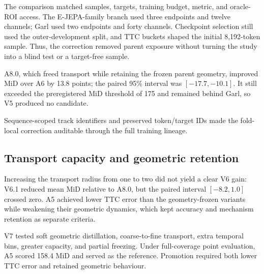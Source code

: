 The comparison matched samples, targets, training budget, metric, and oracle-ROI access. The E-JEPA-family branch used three endpoints and twelve channels; Garl used two endpoints and forty channels. Checkpoint selection still used the outer-development split, and TTC buckets shaped the initial 8,192-token sample. Thus, the correction removed parent exposure without turning the study into a blind test or a target-free sample. 

\begin{table}[htbp]
\centering\small

\caption{Scientific Recovery V5--V6 results on 8,192 tokens from nine sequences, three folds, and seed 7.}
\label{tab:early-v5v6}
\end{table}

A8.0, which freed transport while retaining the frozen parent geometry, improved MiD over A6 by 13.8 points; the paired 95\% interval was $[-17.7,-10.1]$. It still exceeded the preregistered MiD threshold of 175 and remained behind Garl, so V5 produced no candidate.

Sequence-scoped track identifiers and preserved token/target IDs made the fold-local correction auditable through the full training lineage. 

\subsection{Transport capacity and geometric retention}

Increasing the transport radius from one to two did not yield a clear V6 gain: V6.1 reduced mean MiD relative to A8.0, but the paired interval $[-8.2,1.0]$ crossed zero. A5 achieved lower TTC error than the geometry-frozen variants while weakening their geometric dynamics, which kept accuracy and mechanism retention as separate criteria.

V7 tested soft geometric distillation, coarse-to-fine transport, extra temporal bins, greater capacity, and partial freezing. Under full-coverage point evaluation, A5 scored 158.4 MiD and served as the reference. Promotion required both lower TTC error and retained geometric behaviour. 

\begin{table}[htbp]
\centering\small

\caption{V7 full-coverage MiD relative to A5, using seed 7 and three outer folds.}
\label{tab:early-v7}
\end{table}

